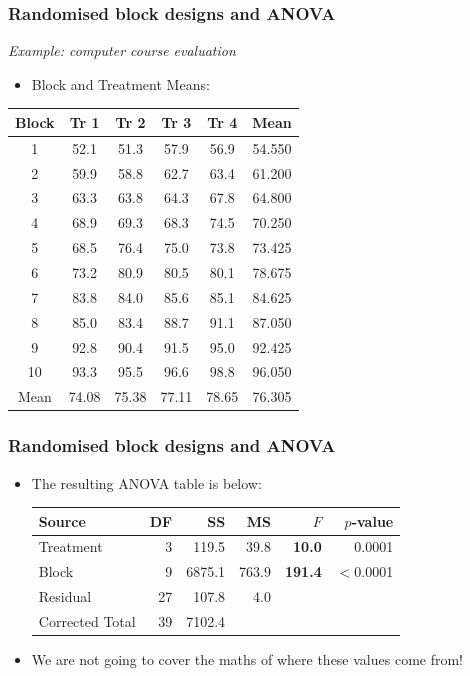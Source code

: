 \documentclass[12pt,xcolor=dvipsnames,handout,mathserif,aspectratio=169]{beamer}
\begin{document}
\begin{frame}
\frametitle{Randomised block designs and ANOVA}
\emph{Example: computer course evaluation}\\
\vspace*{0.3cm}
\begin{itemize}
\item Block and Treatment Means:
\end{itemize}
\begin{center}
\vspace*{0.3cm}
{\small{
\begin{tabular}{c|cccc|c}\hline
Block& Tr 1& Tr 2& Tr 3& Tr 4& Mean\\ \hline
1& 52.1& 51.3& 57.9& 56.9& 54.550\\
2& 59.9& 58.8& 62.7& 63.4& 61.200\\
3& 63.3& 63.8& 64.3& 67.8& 64.800\\
4& 68.9& 69.3& 68.3& 74.5& 70.250\\
5& 68.5& 76.4& 75.0& 73.8& 73.425\\
6& 73.2& 80.9& 80.5& 80.1& 78.675\\
7& 83.8& 84.0& 85.6& 85.1& 84.625\\
8& 85.0& 83.4& 88.7& 91.1& 87.050\\
9& 92.8& 90.4& 91.5& 95.0& 92.425\\
10& 93.3& 95.5& 96.6& 98.8& 96.050\\ \hline
Mean &74.08& 75.38& 77.11& 78.65& 76.305\\ \hline
\end{tabular}}}
\end{center}
\end{frame}


\begin{frame}
\frametitle{Randomised block designs and ANOVA}
\begin{itemize}
\item The resulting ANOVA table is below:
\vspace*{0.3cm}
\begin{center}
{\small{
\begin{tabular}{lrrrrr}\hline
Source& DF& SS &MS & $F$ & $p$-value\\ \hline
Treatment& 3& 119.5& 39.8& \bf{10.0}& 0.0001\\
Block& 9& 6875.1& 763.9 & \bf{191.4}&$<$0.0001\\
Residual& 27& 107.8& 4.0&&\\ \hline
Corrected Total& 39& 7102.4&&&\\\hline
\end{tabular}}}
\end{center}
\vspace*{0.3cm}
\item We are not going to cover the maths of where these values come from!
\end{itemize}
\end{frame}
\end{document}
